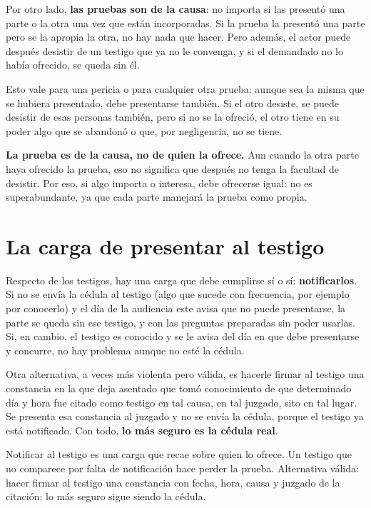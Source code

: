 \documentclass[12pt,oneside]{book}
\begin{document}
Por otro lado, \textbf{las pruebas son de la causa}: no importa si las presentó una parte o la otra una vez que están incorporadas. Si la prueba la presentó una parte pero se la apropia la otra, no hay nada que hacer. Pero además, el actor puede después desistir de un testigo que ya no le convenga, y si el demandado no lo había ofrecido, se queda sin él.

Esto vale para una pericia o para cualquier otra prueba: aunque sea la misma que se hubiera presentado, debe presentarse también. Si el otro desiste, se puede desistir de esas personas también, pero si no se la ofreció, el otro tiene en su poder algo que se abandonó o que, por negligencia, no se tiene.

\begin{important}
\textbf{La prueba es de la causa, no de quien la ofrece.} Aun cuando la otra parte haya ofrecido la prueba, eso no significa que después no tenga la facultad de desistir. Por eso, si algo importa o interesa, debe ofrecerse igual: no es superabundante, ya que cada parte manejará la prueba como propia.
\end{important}

\section{La carga de presentar al testigo}

Respecto de los testigos, hay una carga que debe cumplirse sí o sí: \textbf{notificarlos}. Si no se envía la cédula al testigo (algo que sucede con frecuencia, por ejemplo por conocerlo) y el día de la audiencia este avisa que no puede presentarse, la parte se queda sin ese testigo, y con las preguntas preparadas sin poder usarlas. Si, en cambio, el testigo es conocido y se le avisa del día en que debe presentarse y concurre, no hay problema aunque no esté la cédula.

Otra alternativa, a veces más violenta pero válida, es hacerle firmar al testigo una constancia en la que deja asentado que tomó conocimiento de que determinado día y hora fue citado como testigo en tal causa, en tal juzgado, sito en tal lugar. Se presenta esa constancia al juzgado y no se envía la cédula, porque el testigo ya está notificado. Con todo, \textbf{lo más seguro es la cédula real}.

\begin{important}
Notificar al testigo es una carga que recae sobre quien lo ofrece. Un testigo que no comparece por falta de notificación hace perder la prueba. Alternativa válida: hacer firmar al testigo una constancia con fecha, hora, causa y juzgado de la citación; lo más seguro sigue siendo la cédula.
\end{important}
\end{document}
